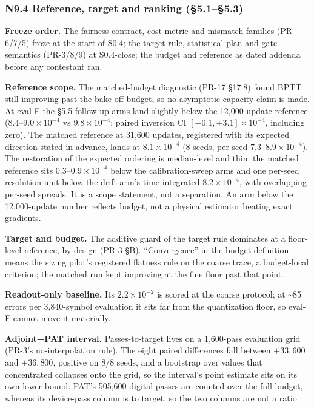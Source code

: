 \documentclass[
  10pt,
]{article}
\begin{document}
\subsubsection{N9.4 Reference, target and ranking
(§5.1--§5.3)}\label{n9.4-reference-target-and-ranking-5.15.3}

\textbf{Freeze order.} The fairness contract, cost metric and mismatch
families (PR-6/7/5) froze at the start of S0.4; the target rule,
statistical plan and gate semantics (PR-3/8/9) at S0.4-close; the budget
and reference as dated addenda before any contestant ran.

\textbf{Reference scope.} The matched-budget diagnostic (PR-17 §17.8)
found BPTT still improving past the bake-off budget, so no
asymptotic-capacity claim is made. At eval-F the §5.5 follow-up arms
land slightly below the 12,000-update reference
(\(8.4\)--\(9.0\times10^{-4}\) vs \(9.8\times10^{-4}\); paired inversion
CI \([-0.1, +3.1]\times10^{-4}\), including zero). The matched reference
at 31,600 updates, registered with its expected direction stated in
advance, lands at \(8.1\times10^{-4}\) (8 seeds, per-seed
\(7.3\)--\(8.9\times10^{-4}\)). The restoration of the expected ordering
is median-level and thin: the matched reference sits
\(0.3\)--\(0.9\times10^{-4}\) below the calibration-sweep arms and one
per-seed resolution unit below the drift arm's time-integrated
\(8.2\times10^{-4}\), with overlapping per-seed spreads. It is a scope
statement, not a separation. An arm below the 12,000-update number
reflects budget, not a physical estimator beating exact gradients.

\textbf{Target and budget.} The additive guard of the target rule
dominates at a floor-level reference, by design (PR-3 §B).
``Convergence'' in the budget definition means the sizing pilot's
registered flatness rule on the coarse trace, a budget-local criterion;
the matched run kept improving at the fine floor past that point.

\textbf{Readout-only baseline.} Its \(2.2\times10^{-2}\) is scored at
the coarse protocol; at \textasciitilde85 errors per 3,840-symbol
evaluation it sits far from the quantization floor, so eval-F cannot
move it materially.

\textbf{Adjoint−PAT interval.} Passes-to-target lives on a 1,600-pass
evaluation grid (PR-3's no-interpolation rule). The eight paired
differences fall between \(+33{,}600\) and \(+36{,}800\), positive on
8/8 seeds, and a bootstrap over values that concentrated collapses onto
the grid, so the interval's point estimate sits on its own lower bound.
PAT's 505,600 digital passes are counted over the full budget, whereas
its device-pass column is to target, so the two columns are not a ratio.
\end{document}
